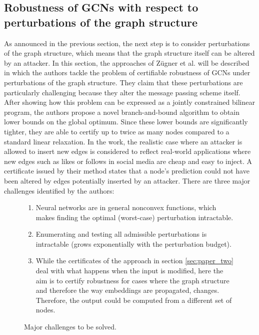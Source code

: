 \documentclass[a4paper,preprint]{sig-alternate}
\begin{document}
\subsection{Robustness of GCNs with respect to perturbations of the graph structure}
\label{sec:paper_three}

As announced in the previous section, the next step is to consider perturbations of the graph structure,
which means that the graph structure itself can be altered by an attacker.
In this section, the approaches of Zügner et al. \cite{10.1145/3394486.3403217} will be described in which the authors
tackle the problem of certifiable robustness of GCNs under perturbations of the graph structure. They claim that these perturbations 
are particularly challenging because they alter the message passing scheme itself.
After showing how this problem can be expressed as a jointly constrained bilinear program, the authors propose a novel branch-and-bound
algorithm to obtain lower bounds on the global optimum. Since these lower bounds are significantly tighter, they are able to
certify up to twice as many nodes compared to a standard linear relaxation.
In the work, the realistic case where an attacker is allowed to insert new edges is considered to reflect real-world
applications where new edges such as likes or follows in social media are cheap and easy to inject. A certificate issued by their method 
states that a node's prediction could not have been altered by edges potentially inserted by an attacker. 
There are three major challenges identified by the authors:

\begin{figure}[h]
    \centering
    \begin{enumerate}
        \item Neural networks are in general nonconvex functions, which makes finding the optimal (worst-case)
        perturbation intractable.
        \item Enumerating and testing all admissible perturbations is intractable (grows exponentially with the perturbation budget).
        \item While the certificates of the approach in section \ref{sec:paper_two} deal with what happens when the input is modified, here the
        aim is to certify robustness for cases where the graph structure and therefore the way embeddings are propagated, changes.
        Therefore, the output could be computed from a different set of nodes.
    \end{enumerate}
    \caption{Major challenges to be solved.}
    \label{fig:challenges}
\end{figure}
\end{document}
